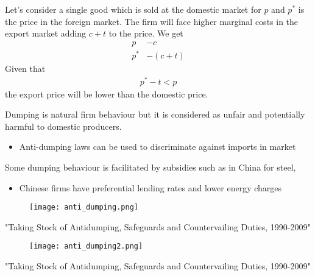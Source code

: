 \documentclass{beamer}
\begin{document}
\begin{frame}
 Let's consider a single good which is sold at the domestic market for $p$ and $p^*$ is the price in the foreign market. 
 The firm will face higher marginal costs in the export market adding $c+t$ to the price. 
 We get
 \begin{align*}
   p&-c\\
   p^*&-(c+t)
 \end{align*}
 Given that
 \begin{align*}
  p^*-t < p
 \end{align*}
 the export price will be lower than the domestic price.
\end{frame}

\begin{frame}
  Dumping is natural firm behaviour but it is considered as unfair and potentially harmful to domestic producers.
  \begin{itemize}
    \item Anti-dumping laws can be used to discriminate against imports in market
  \end{itemize}
  \medskip
  Some dumping behaviour is facilitated by subsidies such as in China for steel, 
  \begin{itemize}
    \item Chinese firms have preferential lending rates and lower energy charges
  \end{itemize}  
\end{frame}

\begin{frame}
  \begin{figure}
    \texttt{[image: anti\_dumping.png]}
  \end{figure}
  "Taking Stock of Antidumping, Safeguards and Countervailing Duties, 1990-2009"
\end{frame}

\begin{frame}
  \begin{figure}
    \texttt{[image: anti\_dumping2.png]}
  \end{figure}
  "Taking Stock of Antidumping, Safeguards and Countervailing Duties, 1990-2009"
\end{frame}
\end{document}
